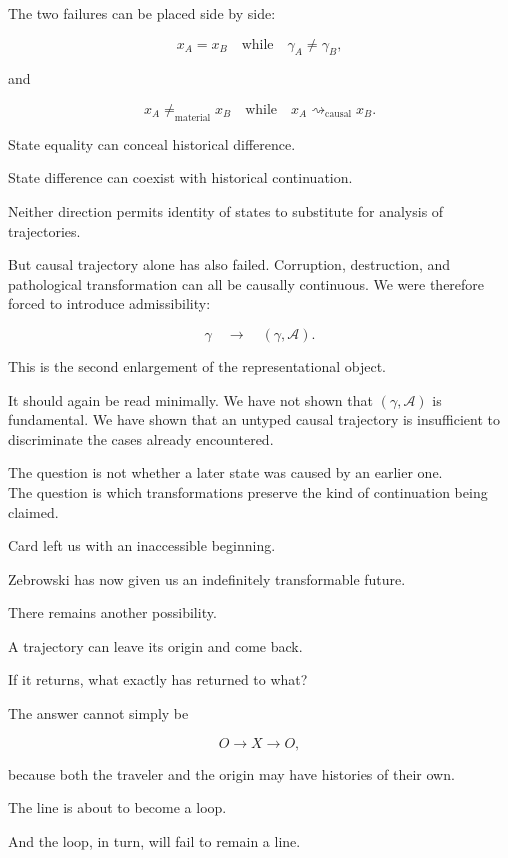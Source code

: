 \documentclass[
  11pt,
  a4paper,
  DIV=12,
  BCOR=0mm,
  parskip=half-
]{scrartcl}
\newcommand{\Adm}{\mathcal A}
\newcommand{\leadcausal}{%
  \mathrel{\rightsquigarrow_{\mathrm{causal}}}%
}
\theoremstyle{definition}
\theoremstyle{plain}
\theoremstyle{remark}
\begin{document}
The two failures can be placed side by side:

\[
  x_A=x_B
  \quad\text{while}\quad
  \gamma_A\neq\gamma_B,
\]

and

\[
  x_A\neq_{\mathrm{material}}x_B
  \quad\text{while}\quad
  x_A\leadcausal x_B.
\]

State equality can conceal historical difference.

State difference can coexist with historical continuation.

Neither direction permits identity of states to substitute for analysis of
trajectories.

But causal trajectory alone has also failed. Corruption, destruction, and
pathological transformation can all be causally continuous. We were therefore
forced to introduce admissibility:

\[
  \gamma
  \quad\longrightarrow\quad
  (\gamma,\Adm).
\]

This is the second enlargement of the representational object.

It should again be read minimally. We have not shown that
\((\gamma,\Adm)\) is fundamental. We have shown that an untyped causal
trajectory is insufficient to discriminate the cases already encountered.

\begin{held}
\centering
The question is not whether a later state was caused by an earlier one.\\[3pt]
The question is which transformations preserve the kind of continuation
being claimed.
\end{held}

Card left us with an inaccessible beginning.

Zebrowski has now given us an indefinitely transformable future.

There remains another possibility.

A trajectory can leave its origin and come back.

If it returns, what exactly has returned to what?

The answer cannot simply be

\[
  O\longrightarrow X\longrightarrow O,
\]

because both the traveler and the origin may have histories of their own.

The line is about to become a loop.

And the loop, in turn, will fail to remain a line.
\end{document}
